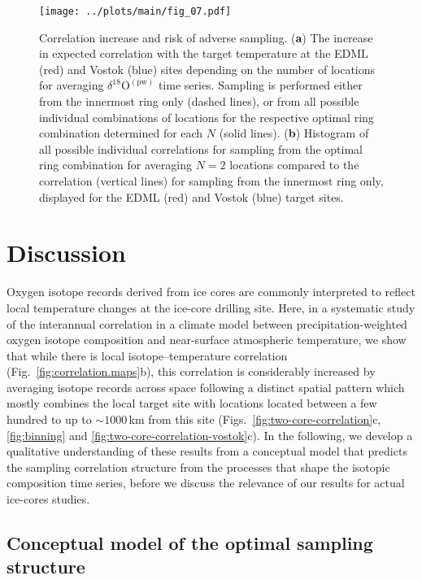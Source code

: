\documentclass[cp, manuscript, draft]{copernicus}
\begin{document}
\begin{figure*}[t]%
\centering
\texttt{[image: ../plots/main/fig\_07.pdf]}
\caption{%
  Correlation increase and risk of adverse sampling. (\textbf{a}) The increase
  in expected correlation with the target temperature at the EDML (red) and
  Vostok (blue) sites depending on the number of locations for averaging
  $\delta^{18}\mathrm{O}^{\mathrm{(pw)}}$ time series. Sampling is performed
  either from the innermost ring only (dashed lines), or from all possible
  individual combinations of locations for the respective optimal ring
  combination determined for each $N$ (solid lines). (\textbf{b}) Histogram of
  all possible individual correlations for sampling from the optimal ring
  combination for averaging $N=2$ locations compared to the correlation
  (vertical lines) for sampling from the innermost ring only, displayed for the
  EDML (red) and Vostok (blue) target sites.}
\label{fig:cor.increase.risk}%
\end{figure*}%

\section{Discussion}\label{discussion}

Oxygen isotope records derived from ice cores are commonly interpreted to
reflect local temperature changes at the ice-core drilling site. Here, in a
systematic study of the interannual correlation in a climate model between
precipitation-weighted oxygen isotope composition and near-surface atmospheric
temperature, we show that while there is local isotope--temperature correlation
(Fig.~\ref{fig:correlation.maps}b), this correlation is considerably increased
by averaging isotope records across space following a distinct spatial pattern
which mostly combines the local target site with locations located between a few
hundred to up to $\sim1000$\,km from this site
(Figs.~\ref{fig:two-core-correlation}c, \ref{fig:binning} and
\ref{fig:two-core-correlation-vostok}c). In the following, we develop a
qualitative understanding of these results from a conceptual model that predicts
the sampling correlation structure from the processes that shape the isotopic
composition time series, before we discuss the relevance of our results for
actual ice-cores studies.

\subsection{Conceptual model of the optimal sampling structure}
\label{discussion:concept.model}
\end{document}
